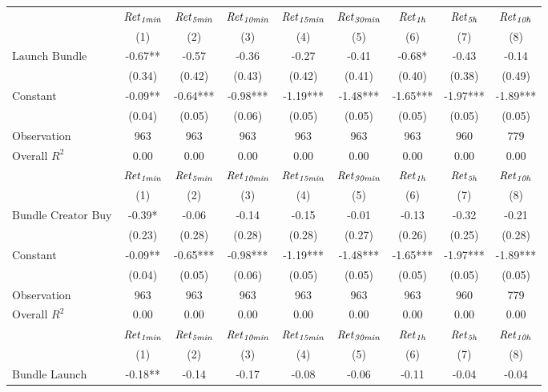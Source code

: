 \begin{tabular}{lcccccccc}
\hline
 & ${\it Ret}_{\it 1min}$ & ${\it Ret}_{\it 5min}$ & ${\it Ret}_{\it 10min}$ & ${\it Ret}_{\it 15min}$ & ${\it Ret}_{\it 30min}$ & ${\it Ret}_{\it 1h}$ & ${\it Ret}_{\it 5h}$ & ${\it Ret}_{\it 10h}$ \\
 & (1) & (2) & (3) & (4) & (5) & (6) & (7) & (8) \\
\hline
$\text{Launch Bundle}$ & -0.67** & -0.57 & -0.36 & -0.27 & -0.41 & -0.68* & -0.43 & -0.14 \\
 & (0.34) & (0.42) & (0.43) & (0.42) & (0.41) & (0.40) & (0.38) & (0.49) \\
Constant & -0.09** & -0.64*** & -0.98*** & -1.19*** & -1.48*** & -1.65*** & -1.97*** & -1.89*** \\
 & (0.04) & (0.05) & (0.06) & (0.05) & (0.05) & (0.05) & (0.05) & (0.05) \\
Observation & 963 & 963 & 963 & 963 & 963 & 963 & 960 & 779 \\
Overall $R^2$ & 0.00 & 0.00 & 0.00 & 0.00 & 0.00 & 0.00 & 0.00 & 0.00 \\
\hline
 & ${\it Ret}_{\it 1min}$ & ${\it Ret}_{\it 5min}$ & ${\it Ret}_{\it 10min}$ & ${\it Ret}_{\it 15min}$ & ${\it Ret}_{\it 30min}$ & ${\it Ret}_{\it 1h}$ & ${\it Ret}_{\it 5h}$ & ${\it Ret}_{\it 10h}$ \\
 & (1) & (2) & (3) & (4) & (5) & (6) & (7) & (8) \\
\hline
$\text{Bundle Creator Buy}$ & -0.39* & -0.06 & -0.14 & -0.15 & -0.01 & -0.13 & -0.32 & -0.21 \\
 & (0.23) & (0.28) & (0.28) & (0.28) & (0.27) & (0.26) & (0.25) & (0.28) \\
Constant & -0.09** & -0.65*** & -0.98*** & -1.19*** & -1.48*** & -1.65*** & -1.97*** & -1.89*** \\
 & (0.04) & (0.05) & (0.06) & (0.05) & (0.05) & (0.05) & (0.05) & (0.05) \\
Observation & 963 & 963 & 963 & 963 & 963 & 963 & 960 & 779 \\
Overall $R^2$ & 0.00 & 0.00 & 0.00 & 0.00 & 0.00 & 0.00 & 0.00 & 0.00 \\
\hline
 & ${\it Ret}_{\it 1min}$ & ${\it Ret}_{\it 5min}$ & ${\it Ret}_{\it 10min}$ & ${\it Ret}_{\it 15min}$ & ${\it Ret}_{\it 30min}$ & ${\it Ret}_{\it 1h}$ & ${\it Ret}_{\it 5h}$ & ${\it Ret}_{\it 10h}$ \\
 & (1) & (2) & (3) & (4) & (5) & (6) & (7) & (8) \\
\hline
$\text{Bundle Launch}$ & -0.18** & -0.14 & -0.17 & -0.08 & -0.06 & -0.11 & -0.04 & -0.04 \\

\end{tabular}
